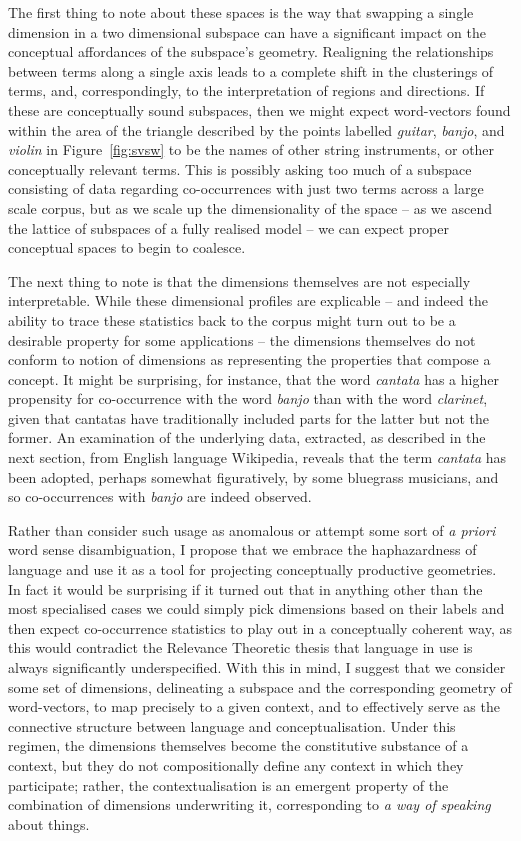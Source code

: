 {The first thing to note about these spaces is the way that swapping a single dimension in a two dimensional subspace can have a significant impact on the conceptual affordances of the subspace's geometry.  Realigning the relationships between terms along a single axis leads to a complete shift in the clusterings of terms, and, correspondingly, to the interpretation of regions and directions.  If these are conceptually sound subspaces, then we might expect word-vectors found within the area of the triangle described by the points labelled \emph{guitar}, \emph{banjo}, and \emph{violin} in Figure~\ref{fig:svsw} to be the names of other string instruments, or other conceptually relevant terms.  This is possibly asking too much of a subspace consisting of data regarding co-occurrences with just two terms across a large scale corpus, but as we scale up the dimensionality of the space -- as we ascend the lattice of subspaces of a fully realised model -- we can expect proper conceptual spaces to begin to coalesce.

The next thing to note is that the dimensions themselves are not especially interpretable.  While these dimensional profiles are explicable -- and indeed the ability to trace these statistics back to the corpus might turn out to be a desirable property for some applications -- the dimensions themselves do not conform to  notion of dimensions as representing the properties that compose a concept.  It might be surprising, for instance, that the word \emph{cantata} has a higher propensity for co-occurrence with the word \emph{banjo} than with the word \emph{clarinet}, given that cantatas have traditionally included parts for the latter but not the former.  An examination of the underlying data, extracted, as described in the next section, from English language Wikipedia, reveals that the term \emph{cantata} has been adopted, perhaps somewhat figuratively, by some bluegrass musicians, and so co-occurrences with \emph{banjo} are indeed observed.

Rather than consider such usage as anomalous or attempt some sort of \emph{a priori} word sense disambiguation, I propose that we embrace the haphazardness of language and use it as a tool for projecting conceptually productive geometries.  In fact it would be surprising if it turned out that in anything other than the most specialised cases we could simply pick dimensions based on their labels and then expect co-occurrence statistics to play out in a conceptually coherent way, as this would contradict the Relevance Theoretic thesis that language in use is always significantly underspecified.  With this in mind, I suggest that we consider some set of dimensions, delineating a subspace and the corresponding geometry of word-vectors, to map precisely to a given context, and to effectively serve as the connective structure between language and conceptualisation.  Under this regimen, the dimensions themselves become the constitutive substance of a context, but they do not compositionally define any context in which they participate; rather, the contextualisation is an emergent property of the combination of dimensions underwriting it, corresponding to \emph{a way of speaking} about things.

}
